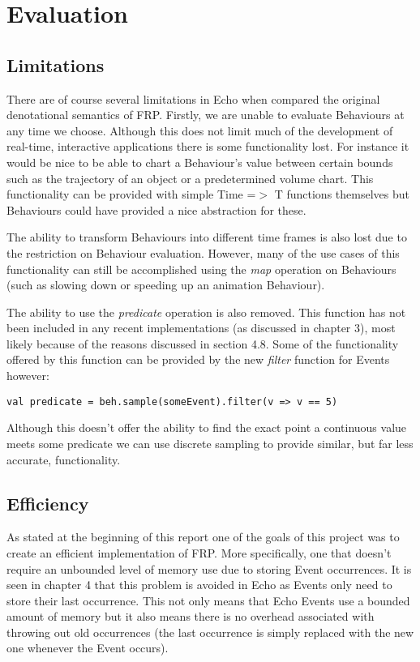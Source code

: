 \chapter{Evaluation}    
  \section{Limitations}
    There are of course several limitations in Echo when compared the original denotational semantics of FRP. Firstly, we are 
    unable to evaluate Behaviours at any time we choose.
    Although this does not limit much of the development of real-time, interactive applications there is some functionality
    lost. For instance it would be nice to be able to chart a Behaviour's value between certain bounds such as
    the trajectory of an object or a predetermined volume chart. This functionality can be provided with simple
    Time =$>$ T functions themselves but Behaviours could have provided a nice abstraction for these.
    
    The ability to transform Behaviours into different time frames is also lost due to the restriction on Behaviour
    evaluation. However, many of the use cases of this functionality can still be accomplished using the
    \emph{map} operation on Behaviours (such as slowing down or speeding up an animation Behaviour).
    
    The ability to use the \emph{predicate} operation is also removed. This function has not been included in any
    recent implementations (as discussed in chapter 3), most likely because of the reasons discussed in section
    4.8. Some of the functionality offered by this function can be provided by the new \emph{filter} function for
    Events however:
    
\begin{verbatim}
val predicate = beh.sample(someEvent).filter(v => v == 5)
\end{verbatim}

    Although this doesn't offer the ability to find the exact point a continuous value meets some predicate we can
    use discrete sampling to provide similar, but far less accurate, functionality.
    
  \section{Efficiency}
    As stated at the beginning of this report one of the goals of this project was to create an efficient implementation
    of FRP. More specifically, one that doesn't require an unbounded level of memory use due to storing Event occurrences.
    It is seen in chapter 4 that this problem is avoided in Echo as Events only need to store their last
    occurrence. This not only means that Echo Events use a bounded amount of memory but it also means there is
    no overhead associated with throwing out old occurrences (the last occurrence is simply replaced with the new 
    one whenever the Event occurs).
    
